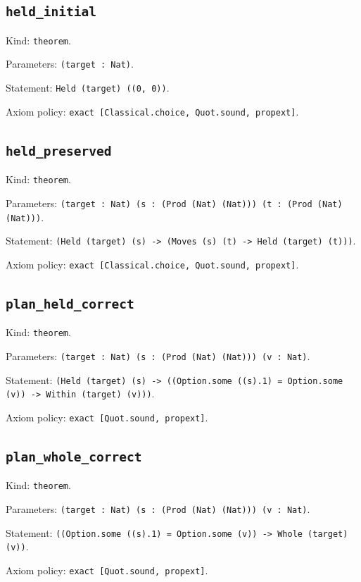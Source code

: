 \documentclass[11pt]{article}
\begin{document}
\subsection*{\texttt{held\_initial}}
\noindent Kind: \texttt{theorem}.\par
\noindent Parameters: \texttt{(target : Nat)}.\par
\noindent Statement: \texttt{Held (target) ((0, 0))}.\par
\noindent Axiom policy: \texttt{exact [Classical.choice, Quot.sound, propext]}.\par
\subsection*{\texttt{held\_preserved}}
\noindent Kind: \texttt{theorem}.\par
\noindent Parameters: \texttt{(target : Nat) (s : (Prod (Nat) (Nat))) (t : (Prod (Nat) (Nat)))}.\par
\noindent Statement: \texttt{(Held (target) (s) -> (Moves (s) (t) -> Held (target) (t)))}.\par
\noindent Axiom policy: \texttt{exact [Classical.choice, Quot.sound, propext]}.\par
\subsection*{\texttt{plan\_held\_correct}}
\noindent Kind: \texttt{theorem}.\par
\noindent Parameters: \texttt{(target : Nat) (s : (Prod (Nat) (Nat))) (v : Nat)}.\par
\noindent Statement: \texttt{(Held (target) (s) -> ((Option.some ((s).1) = Option.some (v)) -> Within (target) (v)))}.\par
\noindent Axiom policy: \texttt{exact [Quot.sound, propext]}.\par
\subsection*{\texttt{plan\_whole\_correct}}
\noindent Kind: \texttt{theorem}.\par
\noindent Parameters: \texttt{(target : Nat) (s : (Prod (Nat) (Nat))) (v : Nat)}.\par
\noindent Statement: \texttt{((Option.some ((s).1) = Option.some (v)) -> Whole (target) (v))}.\par
\noindent Axiom policy: \texttt{exact [Quot.sound, propext]}.\par
\end{document}
